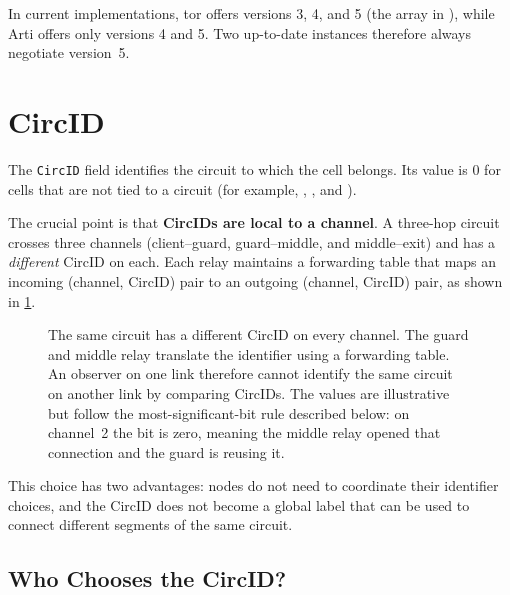 In current implementations, tor offers versions 3, 4, and 5 (the  array in ), while Arti offers only versions 4 and 5. Two up-to-date instances therefore always negotiate version~5.

\section{CircID}\label{sec:circid}

The \texttt{CircID} field identifies the circuit to which the cell belongs. Its value is 0 for cells that are not tied to a circuit (for example, , , and ).

The crucial point is that \textbf{CircIDs are local to a channel}. A three-hop circuit crosses three channels (client--guard, guard--middle, and middle--exit) and has a \emph{different} CircID on each. Each relay maintains a forwarding table that maps an incoming (channel, CircID) pair to an outgoing (channel, CircID) pair, as shown in \cref{fig:circid-locale}.

\begin{figure}[htbp]
\centering

\caption{The same circuit has a different CircID on every channel. The guard and middle relay translate the identifier using a forwarding table. An observer on one link therefore cannot identify the same circuit on another link by comparing CircIDs. The values are illustrative but follow the most-significant-bit rule described below: on channel~2 the bit is zero, meaning the middle relay opened that connection and the guard is reusing it.}
\label{fig:circid-locale}
\end{figure}

This choice has two advantages: nodes do not need to coordinate their identifier choices, and the CircID does not become a global label that can be used to connect different segments of the same circuit.

\subsection{Who Chooses the CircID?}

